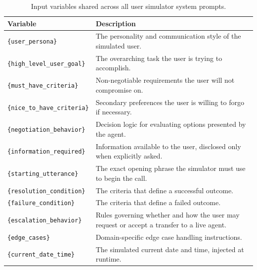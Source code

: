 \begin{table}[h]
\centering
\caption{Input variables shared across all user simulator system prompts.}
\label{tab:simulator-variables}
\begin{tabular}{lp{9cm}}
\toprule
\textbf{Variable} & \textbf{Description} \\
\midrule
\texttt{\{user\_persona\}}           & The personality and communication style of the simulated user. \\
\texttt{\{high\_level\_user\_goal\}} & The overarching task the user is trying to accomplish. \\
\texttt{\{must\_have\_criteria\}}    & Non-negotiable requirements the user will not compromise on. \\
\texttt{\{nice\_to\_have\_criteria\}}& Secondary preferences the user is willing to forgo if necessary. \\
\texttt{\{negotiation\_behavior\}}   & Decision logic for evaluating options presented by the agent. \\
\texttt{\{information\_required\}}   & Information available to the user, disclosed only when explicitly asked. \\
\texttt{\{starting\_utterance\}}     & The exact opening phrase the simulator must use to begin the call. \\
\texttt{\{resolution\_condition\}}   & The criteria that define a successful outcome. \\
\texttt{\{failure\_condition\}}      & The criteria that define a failed outcome. \\
\texttt{\{escalation\_behavior\}}    & Rules governing whether and how the user may request or accept a transfer to a live agent. \\
\texttt{\{edge\_cases\}}             & Domain-specific edge case handling instructions. \\
\texttt{\{current\_date\_time\}}     & The simulated current date and time, injected at runtime. \\
\bottomrule
\end{tabular}
\end{table}